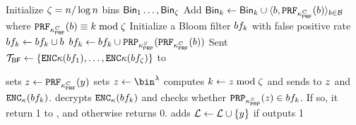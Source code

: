 \begin{algorithm}
\begin{algorithmic}[1]
\Statex{}
\State Initialize $\zeta = n/ \log n$ bins $\mathsf{Bin}_{1} \dots, \mathsf{Bin}_{\zeta}$
\State Add $\binn{\bloomFilterIdx} \assign \binn{\bloomFilterIdx} \cup \langle \genericBlocklistElmt, \prf{\prfKeyClient}(\genericBlocklistElmt) \rangle_{\genericBlocklistElmt \in \blocklist}$ where $ \prf{\prfKeyClient}(\genericBlocklistElmt) \equiv \bloomFilterIdx \bmod \numBins$
\EndFor
{}
\State Initialize a Bloom filter $\bloomFilter[\bloomFilterIdx]$ with false positive rate \bloomFilterEpsilon 
{}
\State $\bloomFilter[\bloomFilterIdx] \assign \bloomFilter[\bloomFilterIdx] \cup \genericBlocklistElmt$
\State $\bloomFilter[\bloomFilterIdx] \assign \bloomFilter[\bloomFilterIdx] \cup \prp{\prpKeyServer}(\prf{\prfKeyClient}(\genericBlocklistElmt))$
\EndFor
\EndFor
\State Sent $\bfBlklistToken \assign \{\encrypt{\genericSymmKey}(\bloomFilter[1]), \dots, \encrypt{\genericSymmKey}(\bloomFilter[\numBins])\}$ to \client

\EndProcedure


\Statex\Procedure{\searchBlocklist}{\genericCInputElmt, \bfBlklistToken}

\If{$\genericCInputElmt \notin \prevHashList$}
\State \client sets $\genericCInputElmtPRFEval \assign \prf{\prfKeyClient}(\genericCInputElmt)$
\Else 
\State \client sets $\genericCInputElmtPRFEval \assign \bin^{\secParam}$
\EndIf
\State \client computes $k \gets z \bmod \zeta$ and sends to \server $z$ and $\encrypt[\genericSymmKey](\bloomFilter[\bloomFilterIdx])$. 
\State \server decrypts $\encrypt[\genericSymmKey](\bloomFilter[\bloomFilterIdx])$ and checks whether $\prp{\prpKeyServer}(\genericCInputElmtPRFEval) \in \bloomFilter[\bloomFilterIdx]$. If so, it return 1 to \client, and otherwise returns 0. 
\State \client adds $\prevHashList \assign \prevHashList \cup \{\genericCInputElmt\}$ if \server outputs 1
\EndProcedure
\end{algorithmic}
\end{algorithm}


